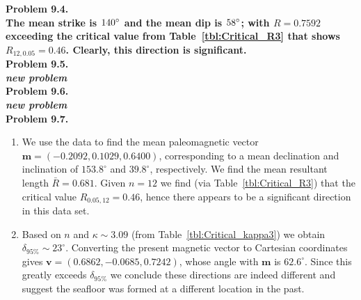 \noindent
\bf{Problem 9.4.} \\

The mean strike is $140^{\circ}$ and the mean dip is $58^{\circ}$; with $R = 0.7592$ exceeding the
critical value from Table~\ref{tbl:Critical_R3} that shows $R_{12,0.05} = 0.46$.
Clearly, this direction is significant.
\\

\noindent
\bf{Problem 9.5.} \\

{\it new problem}\\

\noindent
\bf{Problem 9.6.} \\

{\it new problem}\\

\noindent
\bf{Problem 9.7.} \\

\begin{enumerate}[label=\alph*)]
\item We use the data to find the mean paleomagnetic vector
$\mathbf{m} = (-0.2092, 0.1029, 0.6400)$, corresponding to a mean declination and inclination of $153.8^{\circ}$ and $39.8^{\circ}$,
respectively.  We find the mean resultant length $\bar{R} = 0.681$.  Given $n = 12$ we find (via Table~\ref{tbl:Critical_R3}) that
the critical value $R_{0.05,12} = 0.46$, hence there appears to be a significant direction in this data set.

\item Based on $n$ and $\kappa \sim 3.09$ (from Table~\ref{tbl:Critical_kappa3}) we obtain $\delta_{95\%} \sim 23^{\circ}$.
Converting the present magnetic vector to Cartesian coordinates gives $\mathbf{v} = (0.6862, -0.0685, 0.7242)$, whose
angle with $\mathbf{m}$ is $62.6^{\circ}$. Since this greatly exceeds $\delta_{95\%}$ we conclude these directions are indeed
different and suggest the seafloor was formed at a different location in the past.
\end{enumerate}
